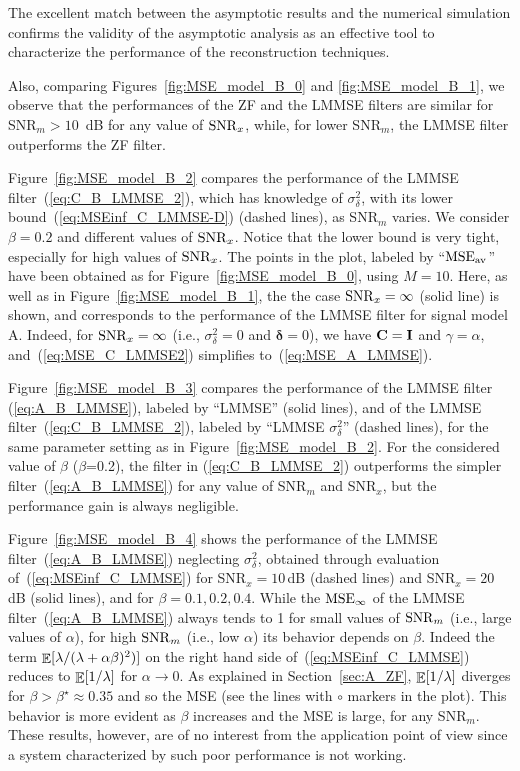 \documentclass[final, a4paper]{IEEEtran}
\newcommand{\Cm}{{\bf C}}
\newcommand{\Id}{{\bf I}}
\newcommand{\deltav}{\boldsymbol{\delta}}
\def\MSEav{{\rm MSE}_{\rm av}}
\def\MSEinf{{\rm MSE}_{\infty}}
\begin{document}
 The excellent match between the asymptotic results and the
numerical simulation confirms the validity of the asymptotic analysis as an effective tool
to characterize the performance of the reconstruction techniques.

Also, comparing Figures~\ref{fig:MSE_model_B_0} and \ref{fig:MSE_model_B_1}, we observe that
the performances of the ZF and the LMMSE filters are similar for SNR$_m>10$~dB for
any value of ${\rm SNR}_x$, while, for lower SNR$_m$,
the LMMSE filter outperforms the ZF filter.

Figure~\ref{fig:MSE_model_B_2} compares the performance of the LMMSE filter~(\ref{eq:C_B_LMMSE_2}), which
has knowledge of $\sigma^2_\delta$, with its lower bound~(\ref{eq:MSEinf_C_LMMSE-D}) (dashed lines), as SNR$_m$ varies.
We consider $\beta=0.2$ and different values of ${\rm SNR}_x$. Notice that the lower bound is
very tight, especially for high values of ${\rm SNR}_x$.
The points in the plot, labeled by ``$\MSEav$'' have been obtained as for Figure~\ref{fig:MSE_model_B_0}, using $M=10$.
Here, as well as in Figure~\ref{fig:MSE_model_B_1}, the the case ${\rm SNR}_x=\infty$ (solid line) is shown, and
corresponds to the performance of the LMMSE filter for signal model A. Indeed, for ${\rm SNR}_x=\infty$ (i.e., $\sigma^2_\delta=0$ and $\deltav=0$), we have $\Cm=\Id$ and $\gamma=\alpha$, and~(\ref{eq:MSE_C_LMMSE2}) simplifies to~(\ref{eq:MSE_A_LMMSE}).

Figure~\ref{fig:MSE_model_B_3} compares the performance of the LMMSE filter (\ref{eq:A_B_LMMSE}),
labeled by ``LMMSE'' (solid lines), and of
the LMMSE filter~(\ref{eq:C_B_LMMSE_2}), labeled by ``LMMSE $\sigma^2_\delta$'' (dashed lines),
for the same parameter setting as in Figure~\ref{fig:MSE_model_B_2}.
For the considered value of $\beta$ ($\beta$=0.2), the filter in (\ref{eq:C_B_LMMSE_2})
outperforms the simpler filter~(\ref{eq:A_B_LMMSE}) for any value of SNR$_m$ and SNR$_x$,
but the performance gain is always negligible.

Figure~\ref{fig:MSE_model_B_4} shows the performance of the
LMMSE filter~(\ref{eq:A_B_LMMSE}) neglecting $\sigma^2_\delta$,
obtained through evaluation of~(\ref{eq:MSEinf_C_LMMSE}) for
SNR$_x=10$\,dB (dashed lines) and SNR$_x=20$\,dB (solid lines), and
for $\beta=0.1,0.2,0.4$.
While the $\MSEinf$ of the LMMSE filter~(\ref{eq:A_B_LMMSE}) always tends to 1 for
small values of ${\rm SNR}_m$ (i.e., large values of $\alpha$),
for high ${\rm SNR}_m$ (i.e., low $\alpha$) its behavior depends on $\beta$.
Indeed the term $\mathop{\mathbb{E}}\limits[\lambda/(\lambda+\alpha\beta)^2)]$ on the right hand side
of~(\ref{eq:MSEinf_C_LMMSE}) reduces to $\mathop{\mathbb{E}}\limits[1/\lambda]$ for $\alpha\rightarrow 0$.
As explained in Section~\ref{sec:A_ZF}, $\mathop{\mathbb{E}}\limits[1/\lambda]$ diverges for
$\beta>\beta^\star\approx0.35$ and so the MSE (see the lines with $\circ$ markers in the plot).
This behavior is more evident as $\beta$ increases and the MSE is large,
for any SNR$_m$. These results, however, are of no interest from the application point
of view since a system characterized by such poor performance is not working.
\end{document}
